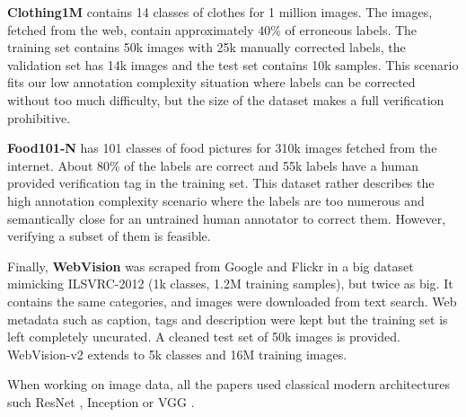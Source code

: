 \textbf{Clothing1M} \citep{MassiveNoisy} contains 14 classes of clothes for 1 million images. The images, fetched from the web, contain approximately 40\% of erroneous labels. The training set contains 50k images with 25k manually corrected labels, the validation set has 14k images and the test set contains 10k samples. This scenario fits our low annotation complexity situation where labels can be corrected without too much difficulty, but the size of the dataset makes a full verification prohibitive.

\textbf{Food101-N} \citep{CleanNet} has 101 classes of food pictures for 310k images fetched from the internet. About 80\% of the labels are correct and 55k labels have a human provided verification tag in the training set. This dataset rather describes the high annotation complexity scenario where the labels are too numerous and semantically close for an untrained human annotator to correct them. However, verifying a subset of them is feasible.

Finally, \textbf{WebVision} \citep{WebVision} was scraped from Google and Flickr in a big dataset mimicking ILSVRC-2012 \citep{imagenet} (1k classes, 1.2M training samples), but twice as big. It contains the same categories, and images were downloaded from text search. Web metadata such as caption, tags and description were kept but the training set is left completely uncurated. A cleaned test set of 50k images is provided. WebVision-v2 extends to 5k classes and 16M training images.

When working on image data, all the papers used classical modern architectures such ResNet \citep{resnet}, Inception \citep{googlenet} or VGG \citep{vgg}.

\newcommand*\rot{\rotatebox{90}}

